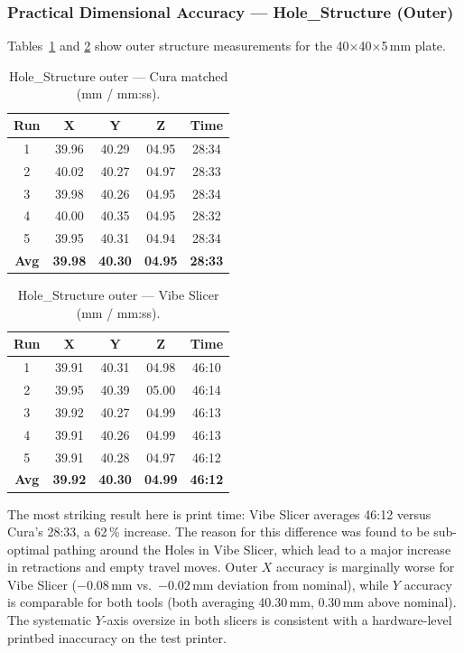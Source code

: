 \documentclass[10pt,twocolumn,a4paper]{article}
\begin{document}
\subsubsection*{Practical Dimensional Accuracy — Hole\_Structure (Outer)}

Tables~\ref{tab:hole_cura_out} and \ref{tab:hole_vibe_out}
show outer structure measurements for the 40$\times$40$\times$5\,mm plate.

\begin{table}[H]
\centering
\caption{Hole\_Structure outer — Cura matched (mm / mm:ss).}
\label{tab:hole_cura_out}
\small
\begin{tabular}{@{}ccccc@{}}
\toprule
\textbf{Run} & \textbf{X} & \textbf{Y} & \textbf{Z} & \textbf{Time} \\
\midrule
1 & 39.96 & 40.29 & 04.95 & 28:34 \\
2 & 40.02 & 40.27 & 04.97 & 28:33 \\
3 & 39.98 & 40.26 & 04.95 & 28:34 \\
4 & 40.00 & 40.35 & 04.95 & 28:32 \\
5 & 39.95 & 40.31 & 04.94 & 28:34 \\
\midrule
\textbf{Avg} & \textbf{39.98} & \textbf{40.30} & \textbf{04.95} & \textbf{28:33} \\
\bottomrule
\end{tabular}
\end{table}

\begin{table}[H]
\centering
\caption{Hole\_Structure outer — Vibe Slicer (mm / mm:ss).}
\label{tab:hole_vibe_out}
\small
\begin{tabular}{@{}ccccc@{}}
\toprule
\textbf{Run} & \textbf{X} & \textbf{Y} & \textbf{Z} & \textbf{Time} \\
\midrule
1 & 39.91 & 40.31 & 04.98 & 46:10 \\
2 & 39.95 & 40.39 & 05.00 & 46:14 \\
3 & 39.92 & 40.27 & 04.99 & 46:13 \\
4 & 39.91 & 40.26 & 04.99 & 46:13 \\
5 & 39.91 & 40.28 & 04.97 & 46:12 \\
\midrule
\textbf{Avg} & \textbf{39.92} & \textbf{40.30} & \textbf{04.99} & \textbf{46:12} \\
\bottomrule
\end{tabular}
\end{table}

The most striking result here is print time: Vibe Slicer averages
46:12 versus Cura's 28:33, a 62\,\% increase. The reason for this difference was found to be sub-optimal pathing around the Holes in Vibe Slicer, which lead to a major increase in retractions and empty travel moves. 
Outer $X$ accuracy is marginally worse for Vibe Slicer
($-0.08$\,mm vs.\ $-0.02$\,mm deviation from nominal),
while $Y$ accuracy is comparable for both tools
(both averaging 40.30\,mm, 0.30\,mm above nominal).
The systematic $Y$-axis oversize in both slicers is consistent
with a hardware-level printbed inaccuracy on the test printer.
\end{document}
